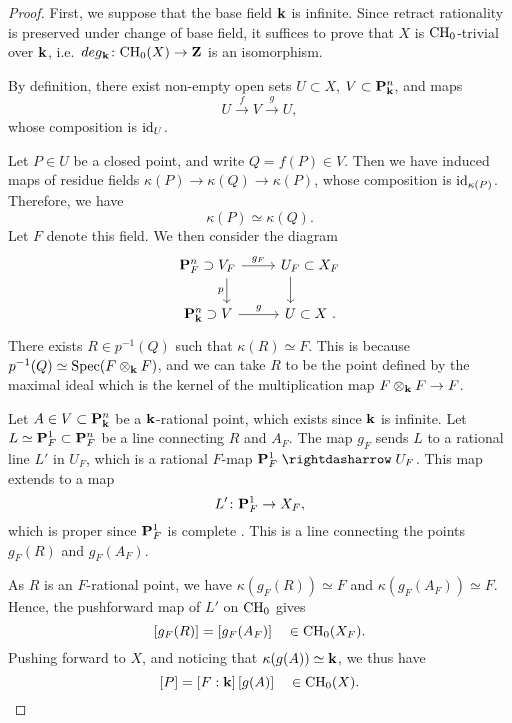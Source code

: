 \begin{proof}
    First, we suppose that the base field $\bbk$ is infinite.
    Since retract rationality is preserved under change of base field,
    it suffices to prove that $X$ is $\mathrm{CH}_0$-trivial over $\bbk$,
    i.e.\ $\deg_{\bbk} \: \CH_0 (X) \to \bbZ$ is an isomorphism.

    By definition, there exist non-empty open sets
    $U \subset X$, $V \subset \bbP_{\bbk}^n$, and maps
    \[ U \overset{f}{\longrightarrow} V \overset{g}{\longrightarrow} U, \]
    whose composition is $\mathrm{id}_U$.

    Let $P \in U$ be a closed point, and write $Q = f(P) \in V$.
    Then we have induced maps of residue fields
    $\kappa (P) \to \kappa (Q) \to \kappa (P)$, whose composition is $\mathrm{id}_{\kappa(P)}$.
    Therefore, we have
    \[ \kappa (P) \simeq \kappa (Q). \]
    Let $F$ denote this field. We then consider the diagram
    \[ \begin{tikzcd}
        \llap{$\bbP_{F}^n \supset {}$} V_F \ar[d, "p"'] \ar[r, "g_F"] &
        U_F \rlap{${} \subset X_F$} \ar[d] \\
        \llap{$\bbP_{\bbk}^n \supset {}$} V \ar[r, "g"] &
        U \rlap{${} \subset X$ .}
    \end{tikzcd} \]
    There exists $R \in p^{-1} (Q)$ such that $\kappa (R) \simeq F$.
    This is because $p^{-1} (Q) \simeq \Spec (F \otimes_{\bbk} F)$,
    and we can take $R$ to be the point defined by the maximal ideal
    which is the kernel of the multiplication map $F \otimes_{\bbk} F \to F$.

    Let $A \in V \subset \bbP_{\bbk}^n$ be a $\bbk$-rational point,
    which exists since $\bbk$ is infinite.
    Let $L \simeq \bbP_F^1 \subset \bbP_F^n$ be a line connecting $R$ and $A_F$.
    The map $g_F$ sends $L$ to a rational line $L'$ in $U_F$,
    which is a rational $F$-map $\bbP_F^1 \mathrel{\rightdasharrow} U_F$.
    This map extends to a map 
    \[ L' \: \bbP_F^1 \to X_F, \]
    which is proper since $\bbP_F^1$ is complete \cite[Corollary~5.4.3]{EGA2}.
    This is a line connecting the points $g_F(R)$ and $g_F(A_F)$. 

    As $R$ is an $F$-rational point, we have $\kappa(g_F(R)) \simeq F$
    and $\kappa( g_F (A_F) ) \simeq F$.
    Hence, the pushforward map of $L'$ on $\mathrm{CH}_0$ gives
    \[ [g_F(R)] = [g_F(A_F)] \quad \in \mathrm{CH}_0 (X_F). \]
    Pushing forward to $X$, and noticing that $\kappa( g(A) ) \simeq \bbk$, we thus have
    \[ [P] = [F : \bbk] \, [g(A)] \quad \in \CH_0 (X). \]
    

\end{proof}
